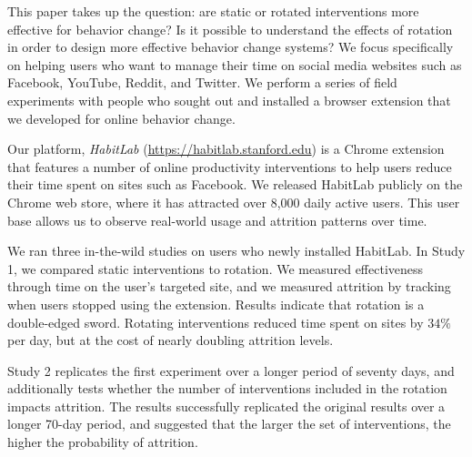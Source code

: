 This paper takes up the question: are static or rotated interventions more effective for behavior change? Is it possible to understand the effects of rotation in order to design more effective behavior change systems? We focus specifically on helping users who want to manage their time on social media websites such as Facebook, YouTube, Reddit, and Twitter. We perform a series of field experiments with people who sought out and installed a browser extension that we developed for online behavior change. %

Our platform, \textit{HabitLab} (\url{https://habitlab.stanford.edu}) is a Chrome extension that features a number of online productivity interventions to help users reduce their time spent on sites such as Facebook. We released HabitLab publicly on the Chrome web store, where it has attracted over 8,000 daily active users. This user base allows us to observe real-world usage and attrition patterns over time. %

We ran three in-the-wild studies on users who newly installed HabitLab. In Study 1, we compared static interventions to rotation. %
We measured effectiveness through time on the user's targeted site, and we measured attrition by tracking when users stopped using the extension.
Results indicate that rotation is a double-edged sword. %
Rotating interventions reduced time spent on sites by $34\%$ per day, but at the cost of nearly doubling attrition levels.  %

Study 2 replicates the first experiment over a longer period of seventy days, and additionally tests whether the number of interventions included in the rotation impacts attrition. The results successfully replicated the original results over a longer 70-day period, and suggested that the larger the set of interventions, the higher the probability of attrition.

